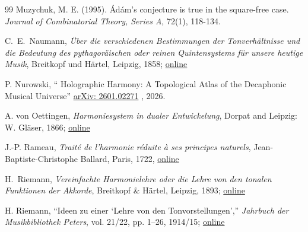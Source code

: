 \documentclass[12pt,letterpaper]{amsart}
\begin{document}
\begin{thebibliography}{99}
 Muzychuk, M. E. (1995). Ádám's conjecture is true in the square-free case. \textit{Journal of Combinatorial Theory, Series A}, 72(1), 118-134.


C.~E.~Naumann,
\emph{\"Uber die verschiedenen Bestimmungen der Tonverh\"altnisse
und die Bedeutung des pythagor\"aischen oder reinen Quintensystems
f\"ur unsere heutige Musik},
Breitkopf und H\"artel, Leipzig, 1858; \href{https://books.google.pl/books?id=Pu-wwE1Ug-cC&printsec=frontcover&hl=pl&source=gbs_ge_summary_r&cad=0#v=onepage&q&f=false}{online}

P. Nurowski,
`` Holographic Harmony: A Topological Atlas of the Decaphonic Musical Universe''
\href{https://arxiv.org/pdf/2601.02271}{arXiv: 2601.02271} , 2026.

A. von Oettingen,
\textit{Harmoniesystem in dualer Entwickelung},
Dorpat and Leipzig: W. Gl\"aser, 1866; \href{https://archive.org/details/harmoniesystemin00oett/page/n11/mode/2up}{online}

J.-P. Rameau,
\textit{Trait{\'e} de l'harmonie r{\'e}duite {\`a} ses principes naturels},
Jean-Baptiste-Christophe Ballard, Paris, 1722, \href{https://archive.org/details/traitdelharmon00rame/page/n5/mode/2up}{online}

H.~Riemann,
\emph{Vereinfachte Harmonielehre oder die Lehre von den tonalen Funktionen der Akkorde},
Breitkopf \& H\"artel, Leipzig, 1893; \href{https://archive.org/details/McGillLibrary-002565430-19384/page/n1/mode/2up}{online}


H. Riemann,
``Ideen zu einer `Lehre von den Tonvorstellungen',''
\textit{Jahrbuch der Musikbibliothek Peters}, vol. 21/22, pp. 1--26, 1914/15; \href{https://www.scribd.com/document/637371695/H-Riemann-Ideen-zu-einer-Lehre-von-den-Tonvorstellungen}{online}

\end{thebibliography}
\end{document}
